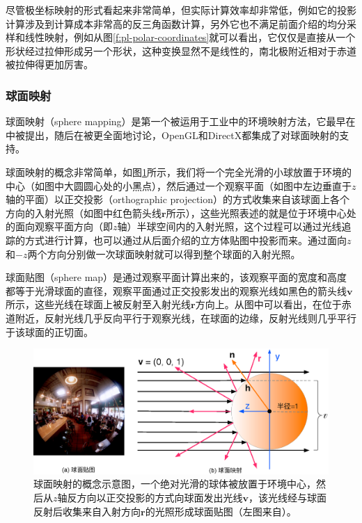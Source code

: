 尽管极坐标映射的形式看起来非常简单，但实际计算效率却非常低，例如它的投影计算涉及到计算成本非常高的反三角函数计算，另外它也不满足前面介绍的均分采样和线性映射，例如从图\ref{f:pl-polar-coordinates}就可以看出，它仅仅是直接从一个形状经过拉伸形成另一个形状，这种变换显然不是线性的，南北极附近相对于赤道被拉伸得更加厉害。



\subsubsection{球面映射}
球面映射（sphere mapping）是第一个被运用于工业中的环境映射方法，它最早在\cite{a:PyramidalParametrics}中被提出，随后在\cite{a:IlluminationandReflectionMaps:SimulatedObjectsinSimulatedandRealEnvironments,a:TextureMappingasaFundamentalDrawingPrimitive}被更全面地讨论，OpenGL和DirectX都集成了对球面映射的支持。

球面映射的概念非常简单，如图\ref{f:pl-sphere-mapping}所示，我们将一个完全光滑的小球放置于环境的中心（如图中大圆圆心处的小黑点），然后通过一个观察平面（如图中左边垂直于$z$轴的平面）以正交投影（orthographic projection）的方式收集来自该球面上各个方向的入射光照（如图中红色箭头线$\mathbf{r}$所示），这些光照表述的就是位于环境中心处的面向观察平面方向（即$z$轴）半球空间内的入射光照，这个过程可以通过光线追踪的方式进行计算，也可以通过从后面介绍的立方体贴图中投影而来。通过面向$z$和$-z$两个方向分别做一次球面映射就可以得到整个球面的入射光照。

球面贴图（sphere map）是通过观察平面计算出来的，该观察平面的宽度和高度都等于光滑球面的直径，观察平面通过正交投影发出的观察光线如黑色的箭头线$\mathbf{v}$所示，这些光线在球面上被反射至入射光线$\mathbf{r}$方向上。从图中可以看出，在位于赤道附近，反射光线几乎反向平行于观察光线，在球面的边缘，反射光线则几乎平行于该球面的正切面。

\begin{figure}
	\includegraphics[width=\textwidth]{figures/pl/sphere-mapping}
	\caption{球面映射的概念示意图，一个绝对光滑的球体被放置于环境中心，然后从$z$轴反方向以正交投影的方式向球面发出光线$\mathbf{v}$，该光线经与球面反射后收集来自入射方向$\mathbf{r}$的光照形成球面贴图（左图来自\cite{a:TheStoryofReflectionMapping}）。}
	\label{f:pl-sphere-mapping}
\end{figure}

